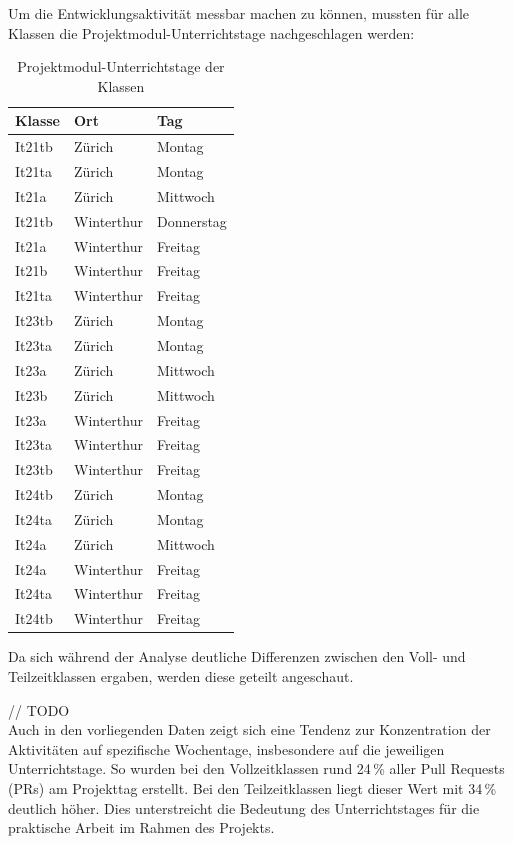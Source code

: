 Um die Entwicklungsaktivität messbar machen zu können, mussten für alle Klassen die Projektmodul-Unterrichtstage nachgeschlagen werden:
\begin{table}[ht]
\caption{Projektmodul-Unterrichtstage der Klassen}
\label{tab:stundenplan}
\centering
\begin{tabular}{l l l}
\toprule
\textbf{Klasse} & \textbf{Ort} & \textbf{Tag} \\
\midrule
It21tb   & Zürich      & Montag      \\
It21ta   & Zürich      & Montag      \\
It21a    & Zürich      & Mittwoch    \\
It21tb   & Winterthur  & Donnerstag  \\
It21a    & Winterthur  & Freitag     \\
It21b    & Winterthur  & Freitag     \\
It21ta   & Winterthur  & Freitag     \\
\midrule
It23tb   & Zürich      & Montag      \\
It23ta   & Zürich      & Montag      \\
It23a    & Zürich      & Mittwoch    \\
It23b    & Zürich      & Mittwoch    \\
It23a    & Winterthur  & Freitag     \\
It23ta   & Winterthur  & Freitag     \\
It23tb   & Winterthur  & Freitag     \\
\midrule
It24tb   & Zürich      & Montag      \\
It24ta   & Zürich      & Montag      \\
It24a    & Zürich      & Mittwoch    \\
It24a    & Winterthur  & Freitag     \\
It24ta   & Winterthur  & Freitag     \\
It24tb   & Winterthur  & Freitag     \\
\bottomrule
\end{tabular}
\end{table}



Da sich während der Analyse deutliche Differenzen zwischen den Voll- und Teilzeitklassen ergaben, werden diese geteilt angeschaut. 

// TODO\\
Auch in den vorliegenden Daten zeigt sich eine Tendenz zur Konzentration der Aktivitäten auf spezifische Wochentage, insbesondere auf die jeweiligen Unterrichtstage. So wurden bei den Vollzeitklassen rund 24\,\% aller Pull Requests (PRs) am Projekttag erstellt. Bei den Teilzeitklassen liegt dieser Wert mit 34\,\% deutlich höher. Dies unterstreicht die Bedeutung des Unterrichtstages für die praktische Arbeit im Rahmen des Projekts.

